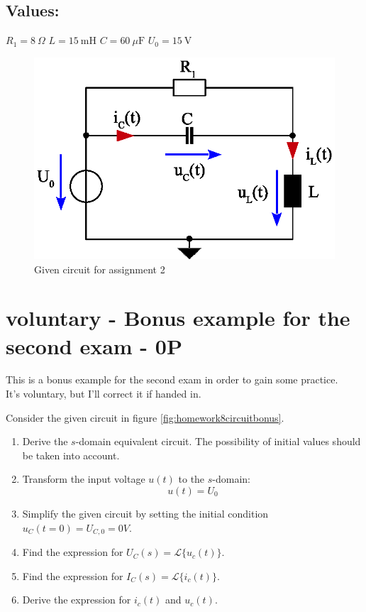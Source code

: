 \documentclass[a4paper]{article}
\begin{document}
\subsection*{Values:}
$R_1 = 8~\Omega$  \qquad $L=15~\text{mH}$ \qquad $C=60~\mu \text{F}$ \qquad $U_0 = 15~\text{V}$ \\
\begin{figure}[h!]
	\centering
	\includegraphics[scale=0.8]{Figures/homework8_circuit_2.eps}
	\caption{Given circuit for assignment 2}
\end{figure}







\section*{voluntary - Bonus example for the second exam - 0P}

This is a bonus example for the second exam in order to gain some practice. \\
It's voluntary, but I'll correct it if handed in. \\
\vspace*{1cm}

Consider the given circuit in figure \ref{fig:homework8circuitbonus}. 

\begin{enumerate}
	\item Derive the $s$-domain equivalent circuit. The possibility of initial values should be taken into account.
	\item Transform the input voltage $u(t)$ to the $s$-domain:
	\begin{equation*}
	u(t)= U_0 
	\end{equation*}
	\item Simplify the given circuit by setting the initial condition $u_C(t = 0) = U_{C,0} = 0V$. 
	\item Find the expression for $U_C(s) = \mathcal{L} \{u_c(t)\}$.
	\item Find the expression for $I_C(s) = \mathcal{L} \{i_c(t)\}$.
	\item Derive the expression for $i_c(t)$ and $u_c(t)$.
\end{enumerate}
\end{document}
